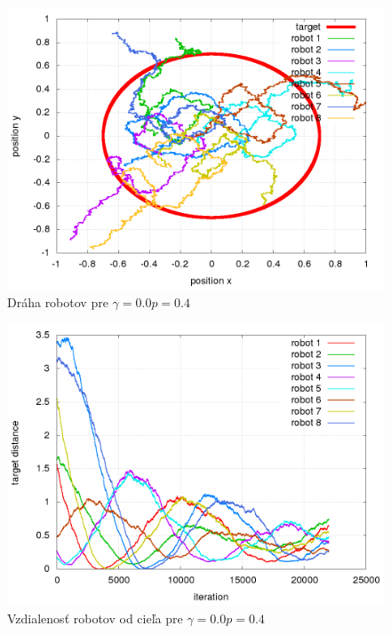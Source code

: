 \begin{figure}[!htb]
\centering
\includegraphics[scale=.4]{../../results_q_learning/nano_q_learning/result_04_01/robot_path.png}
\caption{Dráha robotov pre $\gamma = 0.0 p = 0.4$}
\label{img:nano_q_result_04_1_path}
\end{figure}

\begin{figure}[!htb]
\centering
\includegraphics[scale=.4]{../../results_q_learning/nano_q_learning/result_04_01/robot_reward.png}
\caption{Vzdialenosť robotov od cieľa pre $\gamma = 0.0 p = 0.4$}
\label{img:nano_q_result_04_1_error}
\end{figure}




